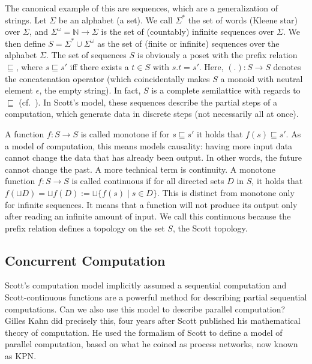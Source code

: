 The canonical example of this are sequences, which are a generalization of strings. Let $\Sigma$ be an alphabet (a set). 
We call $\Sigma^*$ the set of words (Kleene star) over $\Sigma$, and $\Sigma^\omega = \mathbb{N} \rightarrow \Sigma$ is the set of (countably) infinite sequences over $\Sigma$.
We then define $S = \Sigma^* \cup \Sigma^\omega$ as the set of (finite or infinite) sequences over the alphabet $\Sigma$.
The set of sequences $S$ is obviously a \ac{poset} with the prefix relation $\sqsubseteq$, where $s \sqsubseteq s'$ iff there exists a $t \in S$ with $s.t = s'$.
Here, $(.) : S \rightarrow S$ denotes the concatenation operator (which coincidentally makes $S$ a monoid with neutral element $\epsilon$, the empty string).
In fact, $S$ is a complete semilattice with regards to $\sqsubseteq$ (cf.~\cite{lee_matsikoudis_semantics}).
In Scott's model, these sequences describe the partial steps of a computation, which generate data in discrete steps (not necessarily all at once). 

A function $f : S \rightarrow S$ is called monotone if for $s \sqsubseteq s'$ it holds that $f(s) \sqsubseteq s'$.
As a model of computation, this means models causality: having more input data cannot change the data that has already been output.
In other words, the future cannot change the past.
A more technical term is continuity.
A monotone function $f : S \rightarrow S$ is called continuous if for all directed sets $D$ in $S$, it holds that $f (\sqcup D) = \sqcup f(D) := \sqcup \{ f(s) \mid s \in D \}$.
This is distinct from monotone only for infinite sequences. It means that a function will not produce its output only after reading an infinite amount of input.
We call this continuous because the prefix relation defines a topology on the set $S$, the Scott topology.

\subsection{Concurrent Computation}
Scott's computation model implicitly assumed a sequential computation and Scott-continuous functions are a powerful method for describing partial sequential computations.
Can we also use this model to describe parallel computation?
Gilles Kahn did precisely this, four years after Scott published his mathematical theory of computation. 
He used the formalism of Scott to define a model of parallel computation, based on what he coined as process networks, now known as \acf{KPN}\cite{kahn74}.

